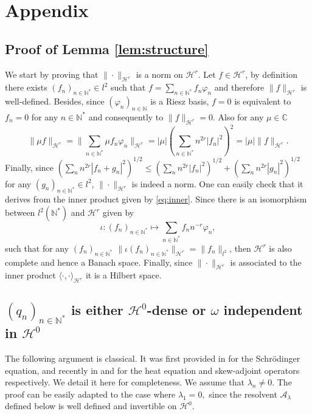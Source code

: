 \documentclass[11pt, dvipsnames]{amsart}
\begin{document}
\section{Appendix}

\subsection{Proof of Lemma \ref{lem:structure}}
\label{app:Riesz}

We start by proving that $\|\cdot\|_{\mathcal{H}^{r}}$ is a norm on $\mathcal{H}^{r}$.  Let $f\in\mathcal{H}^{r}$, by definition there exists $(f_{n})_{n\in\mathbb{N}^{*}}\in l^{2}$ 
    such that $f = \sum\limits_{n\in\mathbb{N}^{*}}f_{n} \varphi_{n}$ 
    and therefore $\|f\|_{\mathcal{H}^{r}}$ is well-defined. 
    Besides, since $(\varphi_{n})_{n\in\mathbb{N}}$ is a Riesz basis, $f = 0$ is equivalent to $f_{n}=0$ for any $n\in\mathbb{N}^{*}$ and consequently to $\|f\|_{\mathcal{H}^{r}}=0$. Also for any $\mu\in\mathbb{C}$
    \begin{equation}
        \|\mu f\|_{\mathcal{H}^{r}} =\| \sum\limits_{n\in\mathbb{N}^{*}}\mu f_{n}\varphi_{n}\|_{\mathcal{H}^{r}} = 
|\mu|\left(\sum\limits_{n\in\mathbb{N}^{*}}n^{2r}|f_{n}|^{2}\right)^{2} = |\mu|\| f\|_{\mathcal{H}^{r}}.
    \end{equation}
    Finally, since $(\sum_{n}n^{2r}|f_{n}+g_{n}|^{2})^{1/2}\leq (\sum_{n}n^{2r}|f_{n}|^{2})^{1/2}+(\sum_{n}n^{2r}|g_{n}|^{2})^{1/2}$ for any $(g_{n})_{n\in\mathbb{N}^{*}}\in l^{2}$, $\|\cdot\|_{\mathcal{H}^{r}}$ is indeed a norm. One can easily check that it derives from the inner product given by \eqref{eq:inner}. 
    Since there is an isomorphism between $l^{2}(\mathbb{N}^{*})$ and $\mathcal{H}^{r}$ given by 
    \begin{equation}
       \iota: (f_{n})_{n\in\mathbb{N}^{*}}\mapsto \sum\limits_{n\in\mathbb{N}^{*}}f_{n}n^{-r}\varphi_{n},
    \end{equation}
    such that for any $(f_{n})_{n\in\mathbb{N}^{*}}$
        $\|\iota (f_{n})_{n\in\mathbb{N}^{*}}\|_{\mathcal{H}^{r}}=\|f_{n}\|_{l^{2}}$,
    then $\mathcal{H}^{r}$ is also complete and hence a Banach space. Finally, since $\|\cdot\|_{\mathcal{H}^{r}}$ is associated to the inner product $\langle \cdot , \cdot\rangle_{\mathcal{H}^{r}}$ it is a Hilbert space.


\subsection{$(q_n)_{n\in \mathbb{N}^*}$ is either ${\mathcal{H}^0}$-dense or $\omega$ independent in ${\mathcal{H}^0}$}\label{sec-appendix-q}
The following argument is classical. It was first provided in \cite{Coron2018-rapid} for the Schrödinger equation, and recently in \cite{Gagnon2022-fredholm-laplacien} and \cite{Gagnon2022-fredholm} for the heat equation and skew-adjoint operators respectively. We detail it here for completeness. We assume that $\lambda_n\neq 0.$ The proof can be easily adapted to the case where $\lambda_1=0,$ since the resolvent $\mathcal{A}_{\lambda}$ defined below is well defined and invertible on ${\mathcal{H}^0}.$
\end{document}
